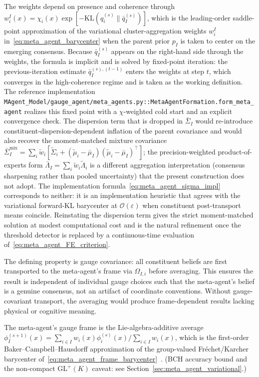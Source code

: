 \documentclass[11pt]{article}
\begin{document}
The weights depend on presence and coherence through $w_i^I(x) = \chi_i(x) \exp[-\mathrm{KL}(q_i^{(s)} \| \bar{q}_I^{(s)})]$, which is the leading-order saddle-point approximation of the variational cluster-aggregation weights $w_i^I$ in~\eqref{eq:meta_agent_barycenter} when the parent prior $p_I$ is taken to center on the emerging consensus. Because $\bar{q}_I^{(s)}$ appears on the right-hand side through the weights, the formula is implicit and is solved by fixed-point iteration: the previous-iteration estimate $\bar{q}_I^{(s),(t-1)}$ enters the weights at step $t$, which converges in the high-coherence regime and is taken as the working definition. The reference implementation \texttt{MAgent\_Model/gauge\_agent/meta\_agents.py::MetaAgentFormation.form\_meta\_agent} realizes this fixed point with a $\chi$-weighted cold start and an explicit convergence check. The dispersion term that is dropped in $\bar{\Sigma}_I$ would re-introduce constituent-dispersion-dependent inflation of the parent covariance and would also recover the moment-matched mixture covariance $\bar{\Sigma}_I^{\mathrm{mix}} = \sum_i \tilde{w}_i[\tilde{\Sigma}_i + (\tilde{\mu}_i - \bar{\mu}_I)(\tilde{\mu}_i - \bar{\mu}_I)^\top]$; the precision-weighted product-of-experts form $\bar\Lambda_I = \sum_i \tilde{w}_i \tilde{\Lambda}_i$ is a different aggregation interpretation (consensus sharpening rather than pooled uncertainty) that the present construction does not adopt. The implementation formula~\eqref{eq:meta_agent_sigma_impl} corresponds to neither: it is an implementation heuristic that agrees with the variational forward-KL barycenter at $\mathcal{O}(\varepsilon)$ when constituent post-transport means coincide. Reinstating the dispersion term gives the strict moment-matched solution at modest computational cost and is the natural refinement once the threshold detector is replaced by a continuous-time evaluation of~\eqref{eq:meta_agent_FE_criterion}.

The defining property is gauge covariance: all constituent beliefs are first transported to the meta-agent's frame via $\Omega_{I,i}$ before averaging. This ensures the result is independent of individual gauge choices such that the meta-agent's belief is a genuine consensus, not an artifact of coordinate conventions. Without gauge-covariant transport, the averaging would produce frame-dependent results lacking physical or cognitive meaning.

The meta-agent's gauge frame is the Lie-algebra-additive average $\phi_I^{(s+1)}(x) = \sum_{i \in I} w_i(x) \phi_i^{(s)}(x) / \sum_{i \in I} w_i(x)$, which is the first-order Baker--Campbell--Hausdorff approximation of the group-valued Fr\'echet/Karcher barycenter of~\eqref{eq:meta_agent_frame_barycenter}~\cite{Hall2015}. (BCH accuracy bound and the non-compact $\mathrm{GL}^+(K)$ caveat: see Section~\ref{sec:meta_agent_variational}.)
\end{document}

